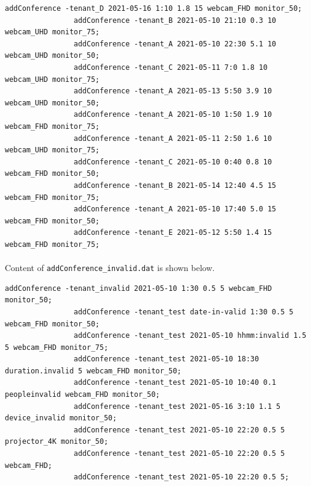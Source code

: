 \documentclass{article}
\begin{document}
\begin{Verbatim}[gobble=8]
                addConference -tenant_D 2021-05-16 1:10 1.8 15 webcam_FHD monitor_50;
                addConference -tenant_B 2021-05-10 21:10 0.3 10 webcam_UHD monitor_75;
                addConference -tenant_A 2021-05-10 22:30 5.1 10 webcam_UHD monitor_50;
                addConference -tenant_C 2021-05-11 7:0 1.8 10 webcam_UHD monitor_75;
                addConference -tenant_A 2021-05-13 5:50 3.9 10 webcam_UHD monitor_50;
                addConference -tenant_A 2021-05-10 1:50 1.9 10 webcam_FHD monitor_75;
                addConference -tenant_A 2021-05-11 2:50 1.6 10 webcam_UHD monitor_75;
                addConference -tenant_C 2021-05-10 0:40 0.8 10 webcam_FHD monitor_50;
                addConference -tenant_B 2021-05-14 12:40 4.5 15 webcam_FHD monitor_75;
                addConference -tenant_A 2021-05-10 17:40 5.0 15 webcam_FHD monitor_50;
                addConference -tenant_E 2021-05-12 5:50 1.4 15 webcam_FHD monitor_75;
            \end{Verbatim}
            \paragraph{}
                Content of \texttt{addConference\_invalid.dat} is shown below.
            \begin{Verbatim}[gobble=8]
                addConference -tenant_invalid 2021-05-10 1:30 0.5 5 webcam_FHD monitor_50;
                addConference -tenant_test date-in-valid 1:30 0.5 5 webcam_FHD monitor_50;
                addConference -tenant_test 2021-05-10 hhmm:invalid 1.5 5 webcam_FHD monitor_75;
                addConference -tenant_test 2021-05-10 18:30 duration.invalid 5 webcam_FHD monitor_50;
                addConference -tenant_test 2021-05-10 10:40 0.1 peopleinvalid webcam_FHD monitor_50;
                addConference -tenant_test 2021-05-16 3:10 1.1 5 device_invalid monitor_50;
                addConference -tenant_test 2021-05-10 22:20 0.5 5 projector_4K monitor_50;
                addConference -tenant_test 2021-05-10 22:20 0.5 5 webcam_FHD;
                addConference -tenant_test 2021-05-10 22:20 0.5 5;
            \end{Verbatim}
\end{document}
